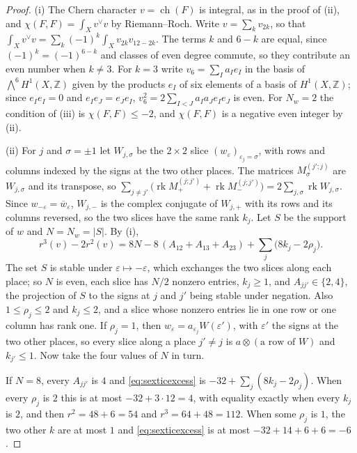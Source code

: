 \documentclass[11pt,reqno]{amsart}
\theoremstyle{plain}
\theoremstyle{definition}
\theoremstyle{remark}
\newcommand{\ZZ}{\mathbb{Z}}
\DeclareMathOperator{\ch}{ch}
\DeclareMathOperator{\rk}{rk}
\newcommand{\bbar}[1]{\overline{#1}}
\begin{document}
\begin{proof}
(i) The Chern character $v=\ch(F)$ is integral, as in the proof of
(ii), and $\chi(F,F)=\int_{X}v^{\vee}v$ by
Riemann--Roch. Write $v=\sum_{k}v_{2k}$, so that
$\int_{X}v^{\vee}v=\sum_{k}(-1)^{k}\int_{X}v_{2k}v_{12-2k}$. The terms $k$ and
$6-k$ are equal, since $(-1)^{k}=(-1)^{6-k}$ and classes of even degree
commute, so they contribute an even number when $k\ne3$. For $k=3$ write
$v_{6}=\sum_{I}a_{I}e_{I}$ in the basis of $\bigwedge^{6}H^{1}(X,\ZZ)$ given
by the products $e_{I}$ of six elements of a basis of $H^{1}(X,\ZZ)$; since
$e_{I}e_{I}=0$ and $e_{I}e_{J}=e_{J}e_{I}$, $v_{6}^{2}=2\sum_{I<J}a_{I}a_{J}
e_{I}e_{J}$ is even. For $N_{w}=2$ the condition of
(iii) is $\chi(F,F)\le-2$, and $\chi(F,F)$ is a
negative even integer by (ii).

(ii) For $j$ and $\sigma=\pm1$ let $W_{j,\sigma}$ be the $2\times2$ slice
$(w_{\varepsilon})_{\varepsilon_{j}=\sigma}$, with rows and columns indexed by
the signs at the two other places. The matrices $M^{(j';j)}_{\sigma}$ are
$W_{j,\sigma}$ and its transpose, so
$\sum_{j\ne j'}\bigl(\rk M^{(j;j')}_{+}+\rk M^{(j;j')}_{-}\bigr)
=2\sum_{j,\sigma}\rk W_{j,\sigma}$. Since $w_{-\varepsilon}=\bbar{w}_{\varepsilon}$,
$W_{j,-}$ is the complex conjugate of $W_{j,+}$ with its rows and its columns
reversed, so the two slices have the same rank $k_{j}$. Let $S$ be the support
of $w$ and $N=N_{w}=|S|$. By (i),
\begin{equation}\label{eq:sexticexcess}
  r^{3}(v)-2r^{2}(v)=8N-8\,(A_{12}+A_{13}+A_{23})
  +\sum_{j}\bigl(8k_{j}-2\rho_{j}\bigr).
\end{equation}
The set $S$ is stable under $\varepsilon\mapsto-\varepsilon$, which exchanges
the two slices along each place; so $N$ is even, each slice has $N/2$ nonzero
entries, $k_{j}\ge1$, and $A_{jj'}\in\{2,4\}$, the projection of $S$ to the
signs at $j$ and $j'$ being stable under negation. Also $1\le\rho_{j}\le2$ and
$k_{j}\le2$, and a slice whose nonzero entries lie in one row or one column
has rank one. If $\rho_{j}=1$, then $w_{\varepsilon}=a_{\varepsilon_{j}}
W(\varepsilon')$, with $\varepsilon'$ the signs at the two other places, so
every slice along a place $j'\ne j$ is $a\otimes(\text{a row of }W)$ and
$k_{j'}\le1$. Now take the four values of $N$ in turn.

If $N=8$, every $A_{jj'}$ is $4$ and \eqref{eq:sexticexcess} is
$-32+\sum_{j}(8k_{j}-2\rho_{j})$. When every $\rho_{j}$ is $2$ this is at most
$-32+3\cdot12=4$, with equality exactly when every $k_{j}$ is $2$, and then
$r^{2}=48+6=54$ and $r^{3}=64+48=112$. When some $\rho_{j}$ is $1$, the two
other $k$ are at most $1$ and \eqref{eq:sexticexcess} is at most
$-32+14+6+6=-6$.


\end{proof}
\end{document}
